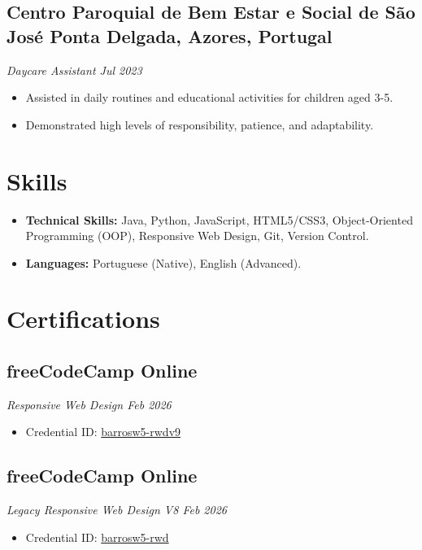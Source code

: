 \documentclass[a4paper,10pt]{article}
\begin{document}
    \subsection*{\texorpdfstring{
            \textbf{Centro Paroquial de Bem Estar e Social de São José} \hfill Ponta Delgada, Azores, Portugal
        }{
            Centro Paroquial de Bem Estar e Social de São José -- Ponta Delgada, Azores, Portugal
        }}
    \textit{Daycare Assistant \hfill Jul 2023}
        \begin{itemize}
            \item Assisted in daily routines and educational activities for children aged 3-5.
            \item Demonstrated high levels of responsibility, patience, and adaptability.
        \end{itemize}


\section{Skills}
    \begin{itemize}
        \item \textbf{Technical Skills:} Java, Python, JavaScript, HTML5/CSS3, Object-Oriented Programming (OOP), Responsive Web Design, Git, Version Control.
        \item \textbf{Languages:} Portuguese (Native), English (Advanced).
    \end{itemize}


\section{Certifications}
    \subsection*{\texorpdfstring{
            \textbf{freeCodeCamp} \hfill Online
        }{
            freeCodeCamp -- Online
        }}
    \textit{Responsive Web Design \hfill Feb 2026}
        \begin{itemize}
            \item Credential ID: \href{https://www.freecodecamp.org/certification/barrosw5/responsive-web-design-v9}{barrosw5-rwdv9}
        \end{itemize}
        
    \subsection*{\texorpdfstring{
            \textbf{freeCodeCamp} \hfill Online
        }{
            freeCodeCamp -- Online
        }}
    \textit{Legacy Responsive Web Design V8 \hfill Feb 2026}
        \begin{itemize}
            \item Credential ID: \href{https://www.freecodecamp.org/certification/barrosw5/responsive-web-design}{barrosw5-rwd}
        \end{itemize}
\end{document}
